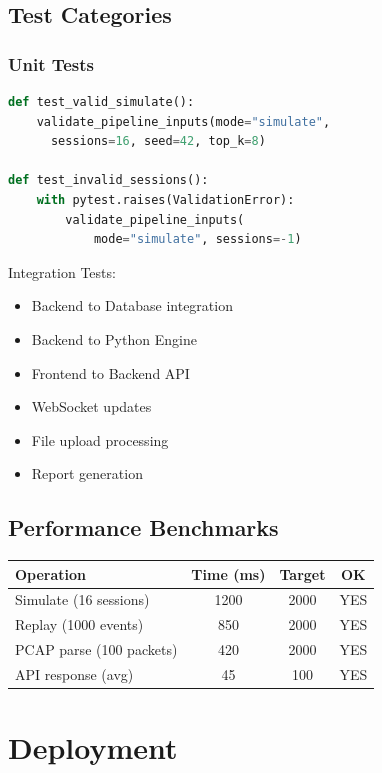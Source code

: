 \documentclass[12pt,a4paper]{report}
\begin{document}
\section{Test Categories}

\subsection{Unit Tests}

\begin{lstlisting}[language=Python]
def test_valid_simulate():
    validate_pipeline_inputs(mode="simulate",
      sessions=16, seed=42, top_k=8)

def test_invalid_sessions():
    with pytest.raises(ValidationError):
        validate_pipeline_inputs(
            mode="simulate", sessions=-1)
\end{lstlisting}

Integration Tests:
\begin{itemize}
    \item Backend to Database integration
    \item Backend to Python Engine
    \item Frontend to Backend API
    \item WebSocket updates
    \item File upload processing
    \item Report generation
\end{itemize}

\section{Performance Benchmarks}

\begin{tabular}{|l|c|c|c|}
\hline
\textbf{Operation} & \textbf{Time (ms)} & \textbf{Target} & \textbf{OK} \\
\hline
Simulate (16 sessions) & 1200 & 2000 & YES \\
Replay (1000 events) & 850 & 2000 & YES \\
PCAP parse (100 packets) & 420 & 2000 & YES \\
API response (avg) & 45 & 100 & YES \\
\hline
\end{tabular}

\chapter{Deployment}
\end{document}

